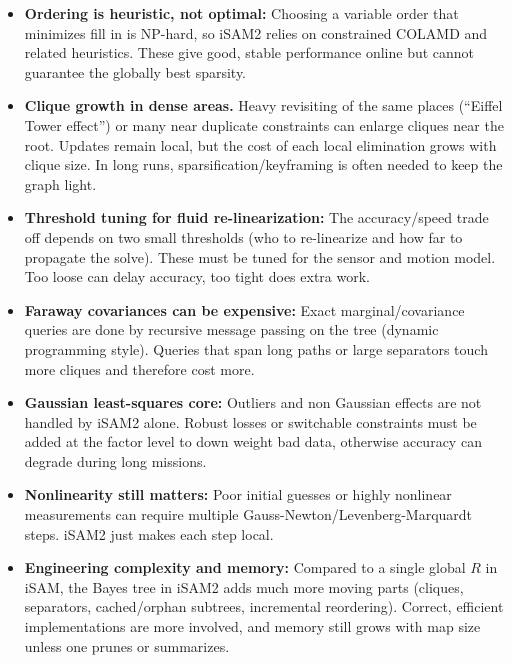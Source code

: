 \begin{itemize}
  \item \textbf{Ordering is heuristic, not optimal:} Choosing a variable order that minimizes fill in is NP-hard, so iSAM2 relies on constrained COLAMD and related heuristics. These give good, stable performance online but cannot guarantee the globally best sparsity.

  \item \textbf{Clique growth in dense areas.} Heavy revisiting of the same places (``Eiffel Tower effect'') or many near duplicate constraints can enlarge cliques near the root. Updates remain local, but the cost of each local elimination grows with clique size. In long runs, sparsification/keyframing is often needed to keep the graph light.

  \item \textbf{Threshold tuning for fluid re-linearization:} The accuracy/speed trade off depends on two small thresholds (who to re-linearize and how far to propagate the solve). These must be tuned for the sensor and motion model. Too loose can delay accuracy, too tight does extra work.

  \item \textbf{Faraway covariances can be expensive:} Exact marginal/covariance queries are done by recursive message passing on the tree (dynamic programming style). Queries that span long paths or large separators touch more cliques and therefore cost more.

  \item \textbf{Gaussian least-squares core:} Outliers and non Gaussian effects are not handled by iSAM2 alone. Robust losses or switchable constraints must be added at the factor level to down weight bad data, otherwise accuracy can degrade during long missions.

  \item \textbf{Nonlinearity still matters:} Poor initial guesses or highly nonlinear measurements can require multiple Gauss-Newton/Levenberg-Marquardt steps. iSAM2 just makes each step local.

  \item \textbf{Engineering complexity and memory:} Compared to a single global $R$ in iSAM, the Bayes tree in iSAM2 adds much more moving parts (cliques, separators, cached/orphan subtrees, incremental reordering). Correct, efficient implementations are more involved, and memory still grows with map size unless one prunes or summarizes.
\end{itemize}
\noindent 
